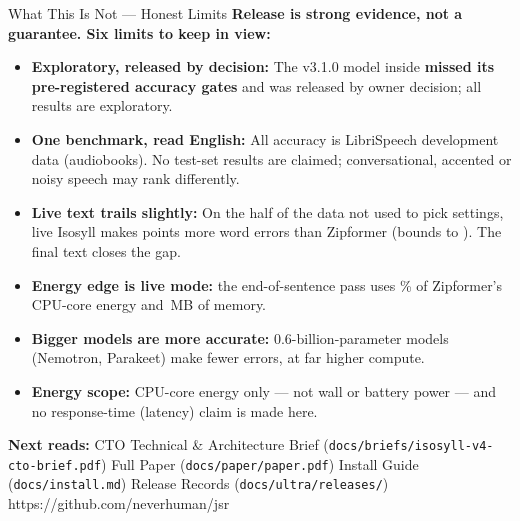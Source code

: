 \documentclass[letterpaper]{article}
\begin{document}
\begin{minipage}[t]{0.495\textwidth}
  \vspace{0pt}
  \begin{govbox}{What This Is Not --- Honest Limits}
    \textbf{Release \releasever{} is strong evidence, not a guarantee. Six limits to keep in view:}
    \begin{itemize}[leftmargin=1.10em,itemsep=1.6pt,topsep=2pt]
      \item \textbf{Exploratory, released by decision:} The v3.1.0 model inside \releasever{} \textbf{missed its pre-registered accuracy gates} and was released by owner decision; all results are exploratory.
      \item \textbf{One benchmark, read English:} All accuracy is LibriSpeech development data (audiobooks). No test-set results are claimed; conversational, accented or noisy speech may rank differently.
      \item \textbf{Live text trails slightly:} On the half of the data not used to pick settings, live Isosyll makes \CandLiveLmCDelta{} points more word errors than Zipformer (bounds \CandLiveLmCLo{} to \CandLiveLmCHi). The final text closes the gap.
      \item \textbf{Energy edge is live mode:} the end-of-sentence pass uses \VsEnergyPctTwo\% of Zipformer's CPU-core energy and \ColdRcTwoFinalRss\,MB of memory.
      \item \textbf{Bigger models are more accurate:} 0.6-billion-parameter models (Nemotron, Parakeet) make fewer errors, at far higher compute.
      \item \textbf{Energy scope:} CPU-core energy only --- not wall or battery power --- and no response-time (latency) claim is made here.
    \end{itemize}
  \end{govbox}
\end{minipage}

%
  {\textbf{Next reads:} CTO Technical \& Architecture Brief (\texttt{docs/briefs/isosyll-v4-cto-brief.pdf}) \;\textbar\; Full Paper (\texttt{docs/paper/paper.pdf}) \;\textbar\; Install Guide (\texttt{docs/install.md}) \;\textbar\; Release Records (\texttt{docs/ultra/releases/})}%
  {https://github.com/neverhuman/jsr}
\end{document}
